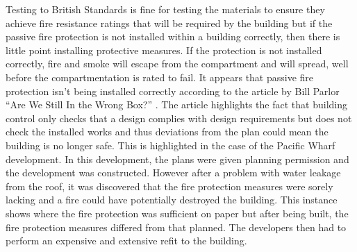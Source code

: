 \documentclass[table,a4paper,oneside]{book}
\begin{document}
Testing to British Standards is fine for testing the materials to ensure they achieve fire resistance ratings that will be required by the building but if the passive fire protection is not installed within a building correctly, then there is little point installing protective measures. If the protection is not installed correctly, fire and smoke will escape from the compartment and will spread, well before the compartmentation is rated to fail. It appears that passive fire protection isn't being installed correctly according to the article by Bill Parlor ``Are We Still In the Wrong Box?'' \citep{Parlor2009}. The article highlights the fact that building control only checks that a design complies with design requirements but does not check the installed works and thus deviations from the plan could mean the building is no longer safe. This is highlighted in the case of the Pacific Wharf development. In this development, the plans were given planning permission and the development was constructed. However after a problem with water leakage from the roof, it was discovered that the fire protection measures were sorely lacking and a fire could have potentially destroyed the building. This instance shows where the fire protection was sufficient on paper but after being built, the fire protection measures differed from that planned. The developers then had to perform an expensive and extensive refit to the building.
\end{document}
